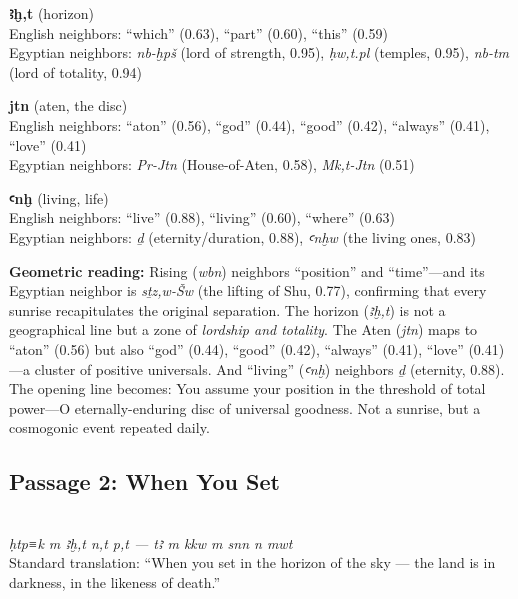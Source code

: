 \documentclass[11pt, a4paper]{article}
\newcommand{\passagehiero}[1]{{\normalfont\hierofont\fontsize{14}{17}\selectfont #1}}
\begin{document}
\medskip

\noindent\textbf{ꜣḫ,t} (horizon)\\
English neighbors: ``which'' (0.63), ``part'' (0.60), ``this'' (0.59)\\
Egyptian neighbors: \textit{nb-ḫpš} (lord of strength, 0.95), \textit{ḥw,t.pl} (temples, 0.95), \textit{nb-tm} (lord of totality, 0.94)

\medskip

\noindent\textbf{jtn} (aten, the disc)\\
English neighbors: ``aton'' (0.56), ``god'' (0.44), ``good'' (0.42), ``always'' (0.41), ``love'' (0.41)\\
Egyptian neighbors: \textit{Pr-Jtn} (House-of-Aten, 0.58), \textit{Mk,t-Jtn} (0.51)

\medskip

\noindent\textbf{ꜥnḫ} (living, life)\\
English neighbors: ``live'' (0.88), ``living'' (0.60), ``where'' (0.63)\\
Egyptian neighbors: \textit{ḏ} (eternity/duration, 0.88), \textit{ꜥnḫw} (the living ones, 0.83)

\medskip

{\color{insight}\textbf{Geometric reading:}} Rising (\textit{wbn}) neighbors ``position'' and ``time''---and its Egyptian neighbor is \textit{sṯz,w-Šw} (the lifting of Shu, 0.77), confirming that every sunrise recapitulates the original separation. The horizon (\textit{ꜣḫ,t}) is not a geographical line but a zone of \textit{lordship and totality}. The Aten (\textit{jtn}) maps to ``aton'' (0.56) but also ``god'' (0.44), ``good'' (0.42), ``always'' (0.41), ``love'' (0.41)---a cluster of positive universals. And ``living'' (\textit{ꜥnḫ}) neighbors \textit{ḏ} (eternity, 0.88). The opening line becomes: You assume your position in the threshold of total power---O eternally-enduring disc of universal goodness. Not a sunrise, but a cosmogonic event repeated daily.

\subsection{Passage 2: When You Set}

{\color{passage}\passagehiero{𓊵𓏏𓂡𓎡 𓅓 𓈌𓏏𓉐 𓈖𓏏 𓇯𓏏 --- 𓇾 𓅓 𓎡𓎡𓇰 𓅓 𓊃𓈖𓈖 𓈖 𓅐𓏏}\\\medskip
\textit{\small ḥtp≡k m ꜣḫ,t n,t p,t --- tꜣ m kkw m snn n mwt}\\
Standard translation: ``When you set in the horizon of the sky --- the land is in darkness, in the likeness of death.''}
\end{document}
